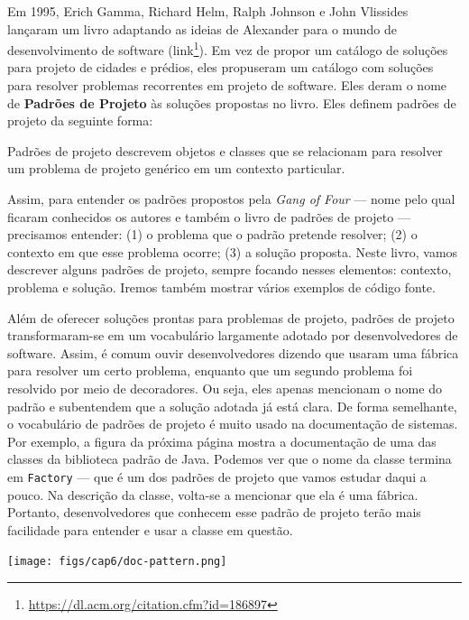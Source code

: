 \documentclass[
  11pt,
  twoside]{book}
\newcommand{\passthrough}[1]{#1}
\DeclareRobustCommand{\href}[2]{#2\footnote{\url{#1}}}
\renewenvironment{quote}{\centering \vspace{1.5ex} \begin{tcolorbox}[colback=backcolor, width=4.9in]}{\end{tcolorbox}}
\let\origfigure\figure
\let\endorigfigure\endfigure
\renewenvironment{figure}[1][2] {
    \expandafter\origfigure\expandafter[!h]
} {
    \endorigfigure
}
\begin{document}
  

Em 1995, Erich Gamma, Richard Helm, Ralph Johnson e John Vlissides
lançaram um livro adaptando as ideias de Alexander para o mundo de
desenvolvimento de software
(\href{https://dl.acm.org/citation.cfm?id=186897}{link}). Em vez de
propor um catálogo de soluções para projeto de cidades e prédios, eles
propuseram um catálogo com soluções para resolver problemas recorrentes
em projeto de software. Eles deram o nome de \textbf{Padrões de Projeto}
às soluções propostas no livro. Eles definem padrões de projeto da
seguinte forma:

\begin{quote}
Padrões de projeto descrevem objetos e classes que se relacionam para
resolver um problema de projeto genérico em um contexto particular.
\end{quote}

 Assim, para entender os padrões propostos pela
\emph{Gang of Four} --- nome pelo qual ficaram conhecidos os autores e
também o livro de padrões de projeto --- precisamos entender: (1) o
problema que o padrão pretende resolver; (2) o contexto em que esse
problema ocorre; (3) a solução proposta. Neste livro, vamos descrever
alguns padrões de projeto, sempre focando nesses elementos: contexto,
problema e solução. Iremos também mostrar vários exemplos de código
fonte.

Além de oferecer soluções prontas para problemas de projeto, padrões de
projeto transformaram-se em um vocabulário largamente adotado por
desenvolvedores de software. Assim, é comum ouvir desenvolvedores
dizendo que usaram uma fábrica para resolver um certo problema, enquanto
que um segundo problema foi resolvido por meio de decoradores. Ou seja,
eles apenas mencionam o nome do padrão e subentendem que a solução
adotada já está clara. De forma semelhante, o vocabulário de padrões de
projeto é muito usado na documentação de sistemas. Por exemplo, a figura
da próxima página mostra a documentação de uma das classes da biblioteca
padrão de Java. Podemos ver que o nome da classe termina em
\passthrough{\lstinline!Factory!} --- que é um dos padrões de projeto
que vamos estudar daqui a pouco. Na descrição da classe, volta-se a
mencionar que ela é uma fábrica. Portanto, desenvolvedores que conhecem
esse padrão de projeto terão mais facilidade para entender e usar a
classe em questão.

\begin{figure}
\centering
\texttt{[image: figs/cap6/doc-pattern.png]}
\caption{Documentação de uma classe \passthrough{\lstinline!Factory!} da
API de Java}
\end{figure}
\end{document}
